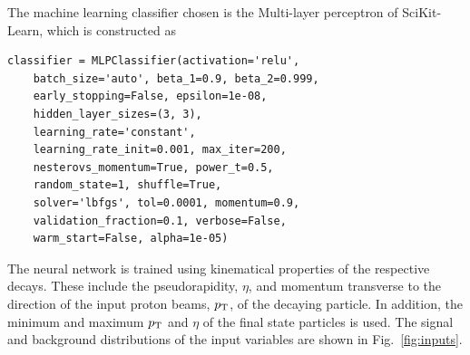 \documentclass[final,5p,times,twocolumn]{elsarticle}
\def\pt         {\mbox{$p_{\rm T}$}\xspace}
\begin{document}
The machine learning classifier chosen is the Multi-layer perceptron of SciKit-Learn,
which is constructed as
\begin{lstlisting}
classifier = MLPClassifier(activation='relu', 
    batch_size='auto', beta_1=0.9, beta_2=0.999, 
    early_stopping=False, epsilon=1e-08, 
    hidden_layer_sizes=(3, 3), 
    learning_rate='constant',
    learning_rate_init=0.001, max_iter=200,
    nesterovs_momentum=True, power_t=0.5, 
    random_state=1, shuffle=True,
    solver='lbfgs', tol=0.0001, momentum=0.9,
    validation_fraction=0.1, verbose=False,
    warm_start=False, alpha=1e-05)
\end{lstlisting}

The neural network is trained using kinematical properties of the respective decays.
These include the pseudorapidity, $\eta$, and momentum transverse to the direction of the 
input proton beams, \pt, of the decaying particle. In addition, the minimum and maximum \pt and $\eta$ 
of the final state particles is used. The signal and background distributions of the input variables
are shown in Fig.~\ref{fig:inputs}.
%
\end{document}
